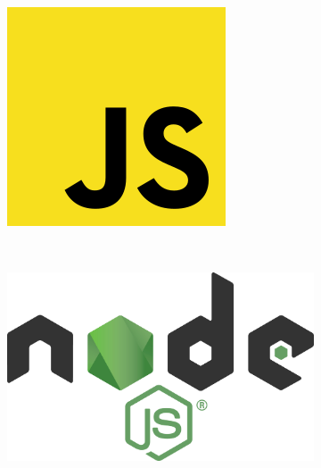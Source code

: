 \begin{figure}[ht]
    \centering
    \begin{subfigure}[b]{0.15\textwidth}
        \includegraphics[width=\textwidth]{mem/images/cap-4/4.1.1(JS)/js-logo.png}
        \label{fig:js}
    \end{subfigure}
    ~ %
    \begin{subfigure}[b]{0.15\textwidth}
        \includegraphics[width=\textwidth]{mem/images/cap-4/4.1.1(JS)/node-logo.png}

\end{subfigure}
\end{figure}
